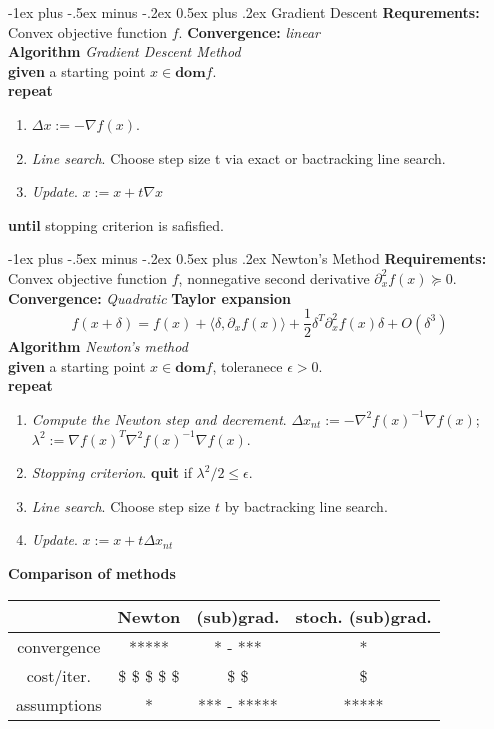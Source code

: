 \documentclass[10pt,landscape]{article}
\makeatletter
\renewcommand{\section}{\@startsection{section}{1}{0mm}%
                                {-1ex plus -.5ex minus -.2ex}%
                                {0.5ex plus .2ex}%
                                {\normalfont\large\bfseries}}
\makeatother
\begin{document}
\begin{multicols}{3}
\section{Gradient Descent}
\textbf{Requrements:} Convex objective function $f$.
\textbf{Convergence:} \emph{linear} \\
\textbf{Algorithm} \emph{Gradient Descent Method} \\
\textbf{given} a starting point $x \in \mathbf{dom} f$. \\
\textbf{repeat}
\begin{enumerate}
    \item $\Delta x := - \nabla f(x)$.
    \item \emph{Line search}. Choose step size t via exact or bactracking line search.
    \item \emph{Update}. $x := x + t \nabla x$
\end{enumerate}
\textbf{until} stopping criterion is safisfied.

\section{Newton's Method}
\textbf{Requirements:} Convex objective function $f$, nonnegative second derivative $\partial_x^2 f(x) \succeq 0$.
\textbf{Convergence:} \emph{Quadratic}
\textbf{Taylor expansion}
$$ f(x + \delta) = f(x) + \langle \delta, \partial_x f(x) \rangle + \frac{1}{2} \delta^T \partial_x^2 f(x) \delta + O(\delta^3) $$
\textbf{Algorithm} \emph{Newton's method} \\
\textbf{given} a starting point $x \in \mathbf{dom} f$, toleranece $\epsilon > 0$. \\
\textbf{repeat}
\begin{enumerate}
    \item \emph{Compute the Newton step and decrement}. $\Delta x_{nt} := - \nabla^2 f(x)^{-1} \nabla f(x)$; $\lambda^2 := \nabla f(x)^T \nabla^2 f(x)^{-1} \nabla f(x)$.
    \item \emph{Stopping criterion}. \textbf{quit} if $\lambda^2 / 2 \leq \epsilon$.
    \item \emph{Line search}. Choose step size $t$ by bactracking line search.
    \item \emph{Update}. $x := x + t \Delta x_{nt}$
\end{enumerate}
\textbf{Comparison of methods}
\begin{tabular} {| c | c | c | c |}
    \hline
    & Newton & (sub)grad. & stoch. (sub)grad. \\
    \hline
    convergence & ***** & * - *** & * \\
    \hline
    cost/iter. & \$ \$ \$ \$ \$ & \$ \$ & \$ \\
    \hline
    assumptions & * & *** - ***** & ***** \\
    \hline
\end{tabular}





\end{multicols}
\end{document}
